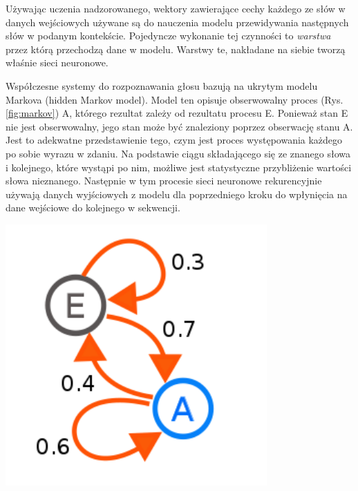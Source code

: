 Używając uczenia nadzorowanego, wektory zawierające cechy każdego ze słów w danych wejściowych używane są do nauczenia modelu przewidywania następnych słów w podanym kontekście. Pojedyncze wykonanie tej czynności to \textit{warstwa} przez którą przechodzą dane w modelu. Warstwy te, nakładane na siebie tworzą właśnie sieci neuronowe. 

Współczesne systemy do rozpoznawania głosu bazują na ukrytym modelu Markova (hidden Markov model). Model ten opisuje obserwowalny proces (Rys. \ref{fig:markov}) A, którego rezultat zależy od rezultatu procesu E. Ponieważ stan E nie jest obserwowalny, jego stan może być znaleziony poprzez obserwację stanu A. Jest to adekwatne przedstawienie tego, czym jest proces występowania każdego po sobie wyrazu w zdaniu. Na podstawie ciągu składającego się ze znanego słowa i kolejnego, które wystąpi po nim, możliwe jest statystyczne przybliżenie wartości słowa nieznanego. Następnie w tym procesie sieci neuronowe rekurencyjnie używają danych wyjściowych z modelu dla poprzedniego kroku do wpłynięcia na dane wejściowe do kolejnego w sekwencji. 

\begin{center}
    \includegraphics[width=10cm]{files/markov.png}
    \label{fig:markov}
\end{center}

